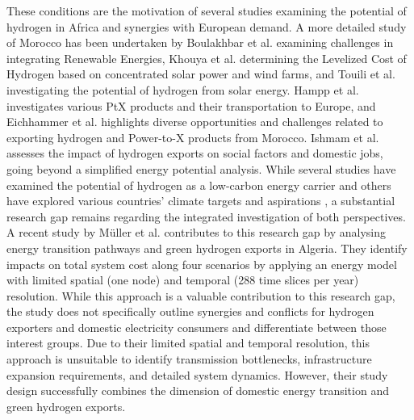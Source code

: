 \documentclass[5p,numafflabel]{elsarticle}
\begin{document}
These conditions are the motivation of several studies \cite{vanWijk2021, AbouSeada2022, vanderZwaan2021, Schellekens2010, Cavana2021, Touili2022, Timmerberg2019a, Sens2022, Franzmann2023} examining the potential of hydrogen in Africa and synergies with European demand. A more detailed study of Morocco has been undertaken by Boulakhbar et al.\cite{Boulakhbar2020} examining challenges in integrating Renewable Energies, Khouya et al.\cite{Khouya2020} determining the Levelized Cost of Hydrogen based on concentrated solar power and wind farms, and Touili et al.\cite{Touili2018} investigating the potential of hydrogen from solar energy. Hampp et al.\cite{Hampp2023} investigates various PtX products and their transportation to Europe, and Eichhammer et al. \cite{Eichhammer2019} highlights diverse opportunities and challenges related to exporting hydrogen and Power-to-X products from Morocco. Ishmam et al. \cite{Ishmam2024} assesses the impact of hydrogen exports on social factors and domestic jobs, going beyond a simplified energy potential analysis.
While several studies \cite{Hampp2023, AbouSeada2022, vanWijk2021} have examined the potential of hydrogen as a low-carbon energy carrier and others have explored various countries' climate targets and aspirations \cite{Boulakhbar2020}, a substantial research gap remains regarding the integrated investigation of both perspectives. 
A recent study by Müller et al.\cite{Muller2024} contributes to this research gap by analysing energy transition pathways and green hydrogen exports in Algeria. They identify impacts on total system cost along four scenarios by applying an energy model with limited spatial (one node) and temporal (288 time slices per year) resolution. While this approach is a valuable contribution to this research gap, the study does not specifically outline synergies and conflicts for hydrogen exporters and domestic electricity consumers and differentiate between those interest groups. 
Due to their limited spatial and temporal resolution, this approach is unsuitable to identify transmission bottlenecks, infrastructure expansion requirements, and detailed system dynamics. However, their study design successfully combines the dimension of domestic energy transition and green hydrogen exports.
\end{document}
